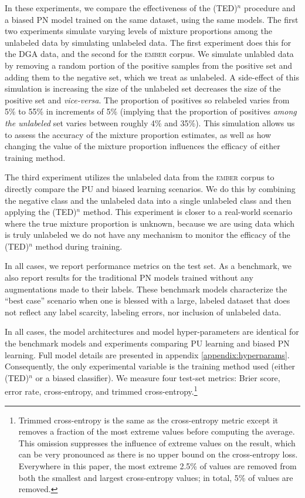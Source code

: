 \documentclass[conference]{IEEEtran}
\begin{document}
    In these experiments, we compare the effectiveness of the (TED)${}^n$ procedure and a biased PN model trained on the same dataset, using the same models. The first two experiments simulate varying levels of mixture proportions among the unlabeled data by simulating unlabeled data. The first experiment does this for the DGA data, and the second for the \textsc{ember} corpus. We simulate unlabled data by removing a random portion of the positive samples from the positive set and adding them to the negative set, which we treat as unlabeled. A side-effect of this simulation is increasing the size of the unlabeled set decreases the size of the positive set and \textit{vice-versa}. The proportion of positives so relabeled varies from 5\% to 55\% in increments of 5\% (implying that the proportion of positives \textit{among the unlabeled} set varies between roughly 4\% and 35\%). This simulation allows us to assess the accuracy of the mixture proportion estimates, as well as how changing the value of the mixture proportion influences the efficacy of either training method. 

    The third experiment utilizes the unlabeled data from the \textsc{ember} corpus to directly compare the PU and biased learning scenarios. We do this by combining the negative class and the unlabeled data into a single unlabeled class and then applying the (TED)${}^n$ method. This experiment is closer to a real-world scenario where the true mixture proportion is unknown, because we are using data which is truly unlabeled we do not have any mechanism to monitor the efficacy of the (TED)${}^n$ method during training.

    In all cases, we report performance metrics on the test set. As a benchmark, we also report results for the traditional PN models trained without any augmentations made to their labels. These benchmark models characterize the ``best case'' scenario when one is blessed with a large, labeled dataset that does not reflect any label scarcity, labeling errors, nor inclusion of unlabeled data.

    In all cases, the model architectures and model hyper-parameters are identical for the benchmark models and experiments comparing PU learning and biased PN learning. Full model details are presented in appendix \ref{appendix:hyperparams}. Consequently, the only experimental variable is the training method used (either (TED)${}^n$ or a biased classifier). We measure four test-set metrics: Brier score, error rate, cross-entropy, and trimmed cross-entropy.\footnote{Trimmed cross-entropy is the same as the cross-entropy metric except it removes a fraction of the most extreme values before computing the average. This omission suppresses the influence of extreme values on the result, which can be very pronounced as there is no upper bound on the cross-entropy loss. Everywhere in this paper, the most extreme 2.5\% of values are removed from both the smallest and largest cross-entropy values; in total, 5\% of values are removed.}
\end{document}
